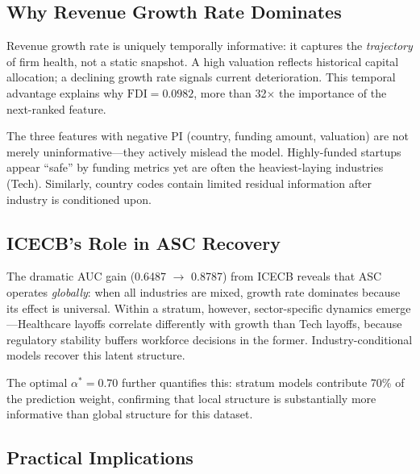 \documentclass[conference]{IEEEtran}
\begin{document}
\subsection{Why Revenue Growth Rate Dominates}

Revenue growth rate is uniquely temporally informative: it captures the \textit{trajectory} of firm health, not a static snapshot. A high valuation reflects historical capital allocation; a declining growth rate signals current deterioration. This temporal advantage explains why $\text{FDI} = 0.0982$, more than 32$\times$ the importance of the next-ranked feature.

The three features with negative PI (country, funding amount, valuation) are not merely uninformative---they actively mislead the model. Highly-funded startups appear ``safe'' by funding metrics yet are often the heaviest-laying industries (Tech). Similarly, country codes contain limited residual information after industry is conditioned upon.

\subsection{ICECB's Role in ASC Recovery}

The dramatic AUC gain (0.6487 $\to$ 0.8787) from ICECB reveals that ASC operates \textit{globally}: when all industries are mixed, growth rate dominates because its effect is universal. Within a stratum, however, sector-specific dynamics emerge---Healthcare layoffs correlate differently with growth than Tech layoffs, because regulatory stability buffers workforce decisions in the former. Industry-conditional models recover this latent structure.

The optimal $\alpha^* = 0.70$ further quantifies this: stratum models contribute 70\% of the prediction weight, confirming that local structure is substantially more informative than global structure for this dataset.

\subsection{Practical Implications}
\end{document}
